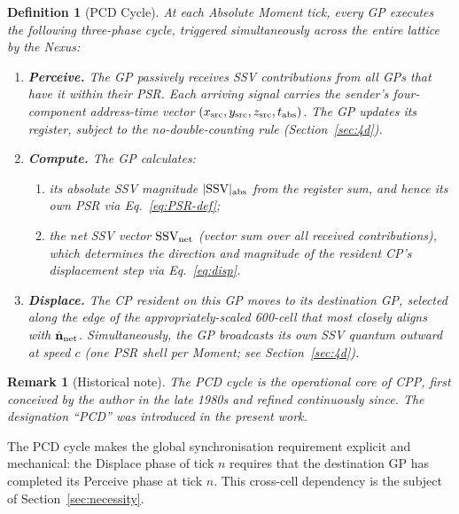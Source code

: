 \documentclass[12pt]{article}
\newtheorem{definition}[theorem]{Definition}
\newtheorem{remark}[theorem]{Remark}
\begin{document}
\begin{definition}[PCD Cycle]
\label{def:pcd}
At each Absolute Moment tick, every GP executes the following three-phase
cycle, triggered simultaneously across the entire lattice by the Nexus:

\begin{enumerate}[label=\textbf{\Alph*.}]
  \item \textbf{Perceive.}  The GP passively receives SSV contributions from
    all GPs that have it within their PSR.  Each arriving signal carries the
    sender's four-component address-time vector
    $(x_{\rm src},y_{\rm src},z_{\rm src},t_{\rm abs})$.  The GP updates its
    register, subject to the no-double-counting rule
    (Section~\ref{sec:4d}).

  \item \textbf{Compute.}  The GP calculates:
    \begin{enumerate}[label=(\roman*)]
      \item its absolute SSV magnitude $|\text{SSV}|_{\rm abs}$ from the
        register sum, and hence its own PSR via Eq.~\eqref{eq:PSR-def};
      \item the net SSV vector $\text{SSV}_{\rm net}$ (vector sum over all
        received contributions), which determines the direction and magnitude
        of the resident CP's displacement step via Eq.~\eqref{eq:disp}.
    \end{enumerate}

  \item \textbf{Displace.}  The CP resident on this GP moves to its
    destination GP, selected along the edge of the appropriately-scaled
    600-cell that most closely aligns with $\hat{\mathbf{n}}_{\rm net}$.
    Simultaneously, the GP broadcasts its own SSV quantum outward at speed
    $c$ (one PSR shell per Moment; see Section~\ref{sec:4d}).
\end{enumerate}
\end{definition}

\begin{remark}[Historical note]
The PCD cycle is the operational core of CPP, first conceived by the author
in the late 1980s and refined continuously since.  The designation
``PCD'' was introduced in the present work.
\end{remark}

The PCD cycle makes the global synchronisation requirement explicit and
mechanical: the Displace phase of tick $n$ requires that the destination GP
has completed its Perceive phase at tick $n$.  This cross-cell dependency is
the subject of Section~\ref{sec:necessity}.
\end{document}
